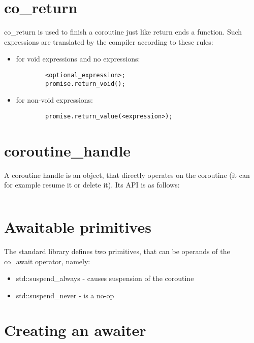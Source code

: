 \documentclass[twoside,twocolumn, 10pt]{article}
\begin{document}
\pagebreak[0]
\section{co\_return}
	co\_return is used to finish a coroutine just like return ends a function. 
	Such expressions are translated by the compiler according to these rules:

	\begin{itemize}
		\item for void expressions and no expressions:
		\begin{verbatim}
		<optional_expression>;
		promise.return_void();
		\end{verbatim}

		\item for non-void expressions:

		\begin{verbatim}
		promise.return_value(<expression>);
	\end{verbatim}
	
	\end{itemize}
		

  \pagebreak[0]
  \section{coroutine\_handle}

	A coroutine handle is an object, that directly operates on the coroutine
	(it can for example resume it or delete it). Its API is as follows:

	\inputminted{c++}{code-examples/theory-custom-coroutine/coroutine-handle.hpp}

	\pagebreak[0]
	\section{Awaitable primitives}

	The standard library defines two primitives, that can be
	operands of the co\_await operator, namely:
	\begin{itemize}
		\item std::suspend\_always - causes suspension of the coroutine
		\item std::suspend\_never - is a no-op
	\end{itemize}

  \pagebreak[0]
	\section{Creating an awaiter}
\end{document}
